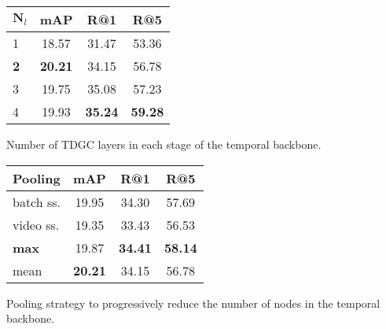 \begin{table*}[tb]
    \caption{Ablations on different components of the hierarchical temporal model.}
    \label{tab:temp_gnn_ablations}
    \vspace{-0.25cm}
    \hfill
    \begin{minipage}{0.3\textwidth}
        \footnotesize
        \begin{tabularx}{1.0\textwidth}{@{}Xccc@{}}
            \toprule
            $\textbf{N}_l$ & \textbf{mAP}   & \textbf{R@1}   & \textbf{R@5}   \\
            \midrule
            1              & 18.57          & 31.47          & 53.36          \\
            \textbf{2}     & \textbf{20.21} & 34.15          & 56.78          \\
            3              & 19.75          & 35.08          & 57.23          \\
            4              & 19.93          & \textbf{35.24} & \textbf{59.28} \\
            \bottomrule
        \end{tabularx}
        \begin{tablenotes}[flushleft]
            \scriptsize
            \item \noindent Number of TDGC layers in each stage of the temporal backbone.
        \end{tablenotes}
    \end{minipage}%
    \hfill
    \begin{minipage}{0.3\textwidth}
        \footnotesize
        \begin{tabularx}{1.0\textwidth}{@{}Xccc@{}}
            \toprule
            \textbf{Pooling} & \textbf{mAP}   & \textbf{R@1}   & \textbf{R@5}   \\
            \midrule
            batch ss.        & 19.95          & 34.30          & 57.69          \\
            video ss.        & 19.35          & 33.43          & 56.53          \\
            \textbf{max}     & 19.87          & \textbf{34.41} & \textbf{58.14} \\
            mean             & \textbf{20.21} & 34.15          & 56.78          \\
            \bottomrule
        \end{tabularx}
        \begin{tablenotes}[flushleft]
            \scriptsize
            \item \noindent Pooling strategy to progressively reduce the number of nodes in the temporal backbone.

\end{tablenotes}
\end{minipage}
\end{table*}
